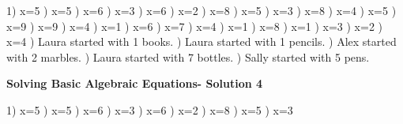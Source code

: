 \documentclass{article}%
\begin{document}
1) x=5%
) x=5%
) x=6%
) x=3%
) x=6%
) x=2%
) x=8%
) x=5%
) x=3%
) x=8%
) x=4%
) x=5%
) x=9%
) x=9%
) x=4%
) x=1%
) x=6%
) x=7%
) x=4%
) x=1%
) x=8%
) x=1%
) x=3%
) x=2%
) x=4%
) Laura started with 1 books.%
) Laura started with 1 pencils.%
) Alex started with 2 marbles.%
) Laura started with 7 bottles.%
) Sally started with 5 pens.%
\newline%
\newpage%
\large%
\begin{center}%
\textbf{Solving Basic Algebraic Equations- Solution 4}%
\newline%
\end{center} \normalsize%
1) x=5%
) x=5%
) x=6%
) x=3%
) x=6%
) x=2%
) x=8%
) x=5%
) x=3%
\end{document}
